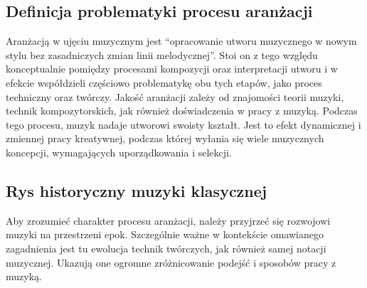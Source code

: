 \subsection{Definicja problematyki procesu aranżacji}
Aranżacją w ujęciu muzycznym jest
\enquote{opracowanie utworu muzycznego w nowym stylu bez zasadniczych zmian linii melodycznej}.
Stoi on z tego względu konceptualnie pomiędzy procesami kompozycji oraz interpretacji utworu
i w efekcie współdzieli częściowo problematykę obu tych etapów, jako proces techniczny oraz twórczy.
Jakość aranżacji zależy od znajomości teorii muzyki, technik kompozytorskich, jak również doświadczenia w pracy z muzyką.
Podczas tego procesu, muzyk nadaje utworowi swoisty kształt. Jest to efekt dynamicznej i zmiennej pracy kreatywnej, podczas
której wyłania się wiele muzycznych koncepcji, wymagających uporządkowania i selekcji.

\subsection{Rys historyczny muzyki klasycznej}
Aby zrozumieć charakter procesu aranżacji, należy przyjrzeć się rozwojowi muzyki na przestrzeni epok.
Szczególnie ważne w kontekście omawianego zagadnienia jest tu ewolucja technik twórczych, jak również samej
notacji muzycznej. Ukazują one ogromne zróżnicowanie podejść i sposobów pracy z muzyką.

